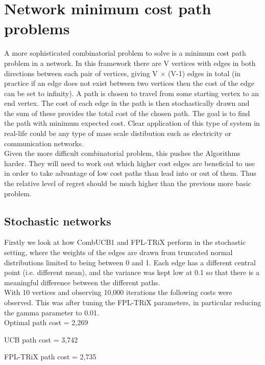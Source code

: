 \section{Network minimum cost path problems}

A more sophisticated combinatorial problem to solve is a minimum cost path problem in a network. In this framework there are V vertices with edges in both directions between each pair of vertices, giving V $\times$ (V-1) edges in total (in practice if an edge does not exist between two vertices then the cost of the edge can be set to infinity). A path is chosen to travel from some starting vertex to an end vertex. The cost of each edge in the path is then stochastically drawn and the sum of these provides the total cost of the chosen path. The goal is to find the path with minimum expected cost. Clear application of this type of system in real-life could be any type of mass scale distibution such as electricity or communication networks.\\

Given the more difficult combinatorial problem, this pushes the Algorithms harder. They will need to work out which higher cost edges are beneficial to use in order to take advantage of low cost paths than lead into or out of them. Thus the relative level of regret should be much higher than the previous more basic problem.\\

\subsection{Stochastic networks}

Firstly we look at how CombUCB1 and FPL-TRiX perform in the stochastic setting, where the weights of the edges are drawn from truncated normal distributions limited to being between 0 and 1. Each edge has a different central point (i.e. different mean), and the variance was kept low at 0.1 so that there is a meaningful difference between the different paths.\\

With 10 vertices and observing 10,000 iterations the following costs were observed. This was after tuning the FPL-TRiX parameters, in particular reducing the gamma parameter to 0.01.\\

Optimal path cost = 2,269

UCB path cost = 3,742

FPL-TRiX path cost = 2,735\\


